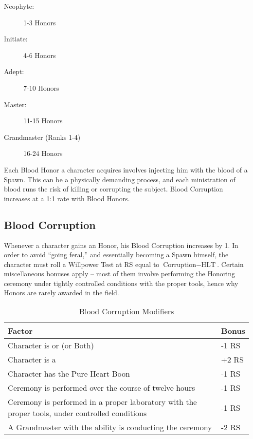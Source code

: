 \documentclass[oneside,11pt,english]{book}
\begin{document}
\begin{description}
\item[Neophyte:] 1-3 Honors
\item[Initiate:] 4-6 Honors
\item[Adept:] 7-10 Honors
\item[Master:] 11-15 Honors
\item[Grandmaster (Ranks 1-4)] 16-24 Honors
\end{description}

Each Blood Honor a character acquires involves injecting him with the blood of a Spawn. This 
can be a physically demanding process, and each ministration of blood runs the risk of killing or 
corrupting the subject. Blood Corruption increases at a 1:1 rate with Blood Honors.

\subsection{Blood Corruption}
Whenever a character gains an Honor, his Blood Corruption increases by 1. In order to avoid 
“going feral,” and essentially becoming a Spawn himself, the character must roll a Willpower 
Test at RS equal to $ \text{Corruption}-\text{HLT} $. Certain miscellaneous bonuses apply -- most of them 
involve performing the Honoring ceremony under tightly controlled conditions with the proper 
tools, hence why Honors are rarely awarded in the field.

\begin{table}[ht]
  \centering
  \caption{Blood Corruption Modifiers}
  \label{tab: Blood Corruption Mods}
  \begin{tabu} spread 0pt {*{2}{X[-1]}}
    Factor&Bonus\\\toprule
    Character is  or  (or Both) &-1 RS\\
    Character is a &+2 RS\\
    Character has the Pure Heart Boon &-1 RS\\
    Ceremony is performed over the course of twelve hours&-1 RS\\
    Ceremony is performed in a proper laboratory with the proper tools, under controlled conditions &-1 RS\\
    A Grandmaster with the  ability is conducting the ceremony&-2 RS\\
  \end{tabu}
\end{table}
\end{document}
